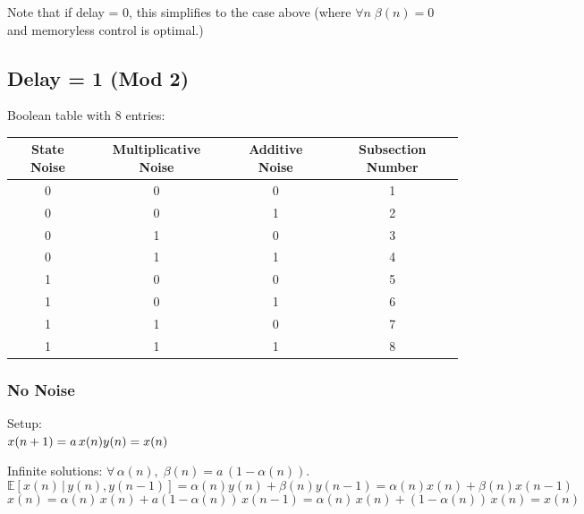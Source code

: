 \documentclass[14pt]{extarticle}
\begin{document}
Note that if delay = 0, this simplifies to the case above (where $\forall n \; \beta(n) = 0$ and memoryless control is optimal.)

\subsection{Delay = 1 (Mod 2)}

Boolean table with 8 entries:\\

{\centering
\begin{tabular}{cccc}
State Noise & Multiplicative Noise & Additive Noise & Subsection Number \\ \hline
0           & 0                    & 0              & 1                 \\
0           & 0                    & 1              & 2                 \\
0           & 1                    & 0              & 3                 \\
0           & 1                    & 1              & 4                 \\
1           & 0                    & 0              & 5                 \\
1           & 0                    & 1              & 6                 \\
1           & 1                    & 0              & 7                 \\
1           & 1                    & 1              & 8                
\end{tabular}}

\setcounter{secnumdepth}{3}
\subsubsection{No Noise}
Setup: \\
\begin{math}
x(n+1) = a \, x(n) \\
y(n) = x(n) \\
\end{math}

Infinite solutions: $\forall \, \alpha(n), \; \beta(n) = a \, (1 - \alpha(n))$. 
\[ \mathbb{E}[x(n) \, | \, y(n), y(n-1) ] = \alpha(n) y(n) + \beta(n) y(n-1) = \alpha(n) x(n)  + \beta(n) x(n-1) \]
\[ \hat{x}(n) = \alpha(n) \, x(n) + a(1-\alpha(n)) \, x(n-1) = \alpha(n) \, x(n) + (1-\alpha(n)) \, x(n) = x(n) \]
\end{document}
